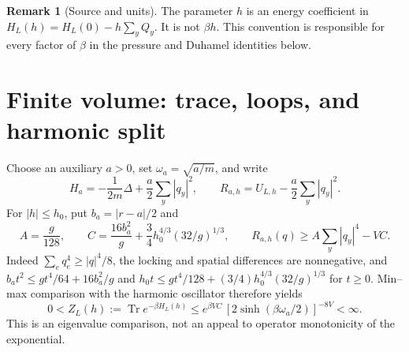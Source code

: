 \documentclass[11pt]{article}
\numberwithin{equation}{section}
\theoremstyle{definition}
\newtheorem{remark}[theorem]{Remark}
\newcommand{\Tr}{\operatorname{Tr}}
\begin{document}
\begin{remark}[Source and units]
The parameter $h$ is an energy coefficient in $H_L(h)=H_L(0)-h\sum_yQ_y$.
It is not $\beta h$.  This convention is responsible for every factor of
$\beta$ in the pressure and Duhamel identities below.
\end{remark}

\section{Finite volume: trace, loops, and harmonic split}
\label{sec:finite}

Choose an auxiliary $a>0$, set $\omega_a=\sqrt{a/m}$, and write
\begin{equation}
 H_a=-\frac1{2m}\Delta+\frac a2\sum_y|q_y|^2,\qquad
 R_{a,h}=U_{L,h}-\frac a2\sum_y|q_y|^2.
 \label{eq:harmonic-split}
\end{equation}
For $|h|\leq h_0$, put $b_a=|r-a|/2$ and
\begin{equation}
 A=\frac g{128},\qquad
 C=\frac{16b_a^2}{g}+\frac34 h_0^{4/3}(32/g)^{1/3},\qquad
 R_{a,h}(q)\geq A\sum_y|q_y|^4-VC.
 \label{eq:residual-lower}
\end{equation}
Indeed $\sum_e q_e^4\geq|q|^4/8$, the locking and spatial differences are
nonnegative, and
$b_at^2\leq gt^4/64+16b_a^2/g$ and
$h_0t\leq gt^4/128+(3/4)h_0^{4/3}(32/g)^{1/3}$ for $t\geq0$.
Min--max comparison with the
harmonic oscillator therefore yields
\begin{equation}
 0<Z_L(h):=\Tr e^{-\beta H_L(h)}
 \leq e^{\beta VC}\,[2\sinh(\beta\omega_a/2)]^{-8V}<\infty.
 \label{eq:trace-bound}
\end{equation}
This is an eigenvalue comparison, not an appeal to operator monotonicity of
the exponential.
\end{document}
